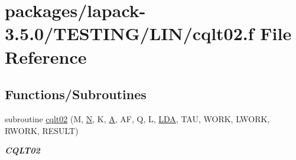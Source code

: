 \hypertarget{cqlt02_8f}{}\section{packages/lapack-\/3.5.0/\+T\+E\+S\+T\+I\+N\+G/\+L\+I\+N/cqlt02.f File Reference}
\label{cqlt02_8f}
\subsection*{Functions/\+Subroutines}
\begin{DoxyCompactItemize}
\item 
subroutine \hyperlink{group__complex__lin_gab080d7fb44320b600b7bd3c4af7e3ad8}{cqlt02} (M, \hyperlink{polmisc_8c_a0240ac851181b84ac374872dc5434ee4}{N}, K, \hyperlink{classA}{A}, A\+F, Q, L, \hyperlink{example__user_8c_ae946da542ce0db94dced19b2ecefd1aa}{L\+D\+A}, T\+A\+U, W\+O\+R\+K, L\+W\+O\+R\+K, R\+W\+O\+R\+K, R\+E\+S\+U\+L\+T)
\begin{DoxyCompactList}\small\item\em {\bfseries C\+Q\+L\+T02} \end{DoxyCompactList}\end{DoxyCompactItemize}
